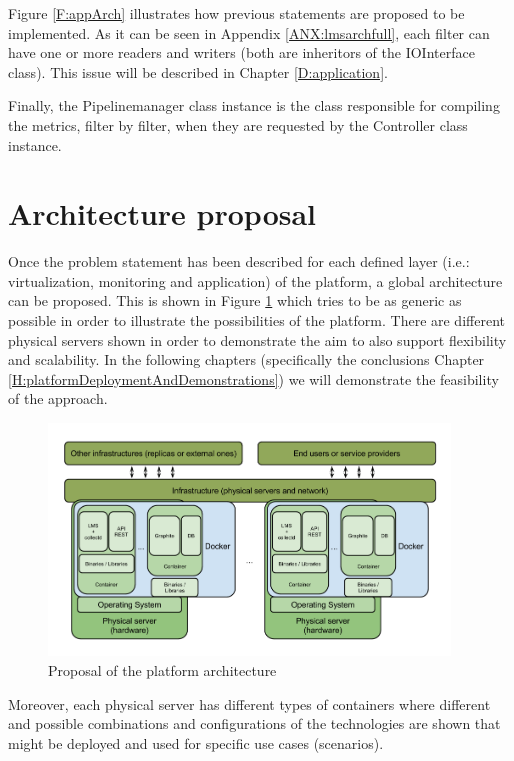 Figure \ref{F:appArch} illustrates how previous statements are proposed to be implemented. As it can be seen in Appendix \ref{ANX:lmsarchfull}, each filter can have one or more readers and writers (both are inheritors of the IOInterface class). This issue will be described in Chapter \ref{D:application}.

Finally, the Pipelinemanager class instance is the class responsible for compiling the metrics, filter by filter, when they are requested by the Controller class instance. 

\section{Architecture proposal}

Once the problem statement has been described for each defined layer (i.e.: virtualization, monitoring and application) of the platform, a global architecture can be proposed. This is shown in Figure \ref{F:overallArchProp} which tries to be as generic as possible in order to illustrate the possibilities of the platform. There are different physical servers shown in order to demonstrate the aim to also support flexibility and scalability. In the following chapters (specifically the conclusions Chapter \ref{H:platformDeploymentAndDemonstrations}) we will demonstrate the feasibility of the approach. 

\begin{figure}[!htb]
\begin{center}
\includegraphics[width=0.95\textwidth]{./images/overallArchProp.png}
\caption{Proposal of the platform architecture}
\label{F:overallArchProp}
\end{center}
\end{figure}


Moreover, each physical server has different types of containers where different and possible combinations and configurations of the technologies are shown that might be deployed and used for specific use cases (scenarios).

